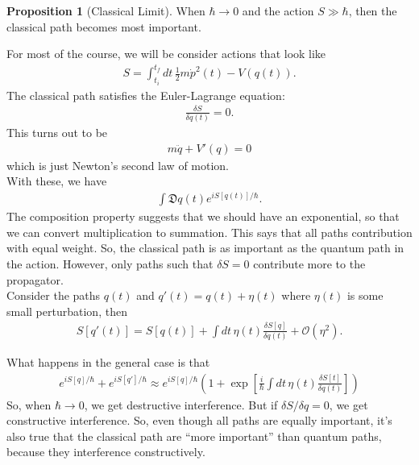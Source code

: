 \documentclass{book}
\theoremstyle{definition}
\newtheorem{prop}{Proposition}[section]
\newcommand{\f}[2]{\frac{#1}{#2}}
\newcommand{\lp}{\left(}
\newcommand{\rp}{\right)}
\newcommand{\lb}{\left[}
\newcommand{\rb}{\right]}
\begin{document}
\begin{prop}[Classical Limit]
	When $\hbar \to 0$ and the action  $S \gg \hbar$, then the classical path becomes most important. 
\end{prop}


For most of the course, we will be consider actions that look like
\begin{align}
S = \int^{t_f}_{t_i} dt\, \f{1}{2}m\dot{p}^2(t) - V(q(t)).
\end{align}
The classical path satisfies the Euler-Lagrange equation: 
\begin{align}
\f{\delta S}{\delta q(t)} = 0.
\end{align}
This turns out to be 
\begin{align}
m\ddot{q} + V'(q) =0 
\end{align}
which is just Newton's second law of motion. \\


With these, we have 
\begin{align}
\int \mathfrak{D}q(t) e^{iS[q(t)]/\hbar}.
\end{align}
The composition property suggests that we should have an exponential, so that we can convert multiplication to summation. This says that all paths contribution with equal weight. So, the classical path is as important as the quantum path in the action. However, only paths such that $\delta S = 0$ contribute more to the propagator. \\

Consider the paths $q(t)$ and $q'(t) = q(t) + \eta (t)$ where $\eta(t)$ is some small perturbation, then 
\begin{align}
S[q'(t)] = S[q(t)] + \int dt\, \eta(t) \f{\delta S[q]}{\delta q(t)} + \mathcal{O}(\eta^2).
\end{align}

What happens in the general case is that 
\begin{align}
e^{iS[q]/\hbar} + e^{iS[q']/\hbar} \approx  e^{iS[q]/\hbar}\lp 1 + \exp\lb \f{i}{\hbar} \int dt\, \eta(t) \f{\delta S[t]}{\delta q(t)} \rb \rp
\end{align}
So, when $\hbar \to 0$, we get destructive interference. But if $\delta S/\delta q = 0$, we get constructive interference. So, even though all paths are equally important, it's also true that the classical path are ``more important'' than quantum paths, because they interference constructively. 
\end{document}
